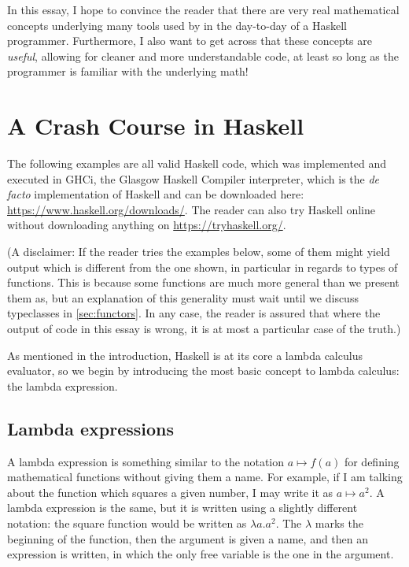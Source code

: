 \documentclass[11pt]{article}
\theoremstyle{nonumberplain}
\begin{document}
In this essay, I hope to convince the reader that there are very real mathematical concepts underlying many tools used by in the day-to-day of a Haskell programmer. Furthermore, I also want to get across that these concepts are \emph{useful}, allowing for cleaner and more understandable code, at least so long as the programmer is familiar with the underlying math!

\section{A Crash Course in Haskell}

The following examples are all valid Haskell code, which was implemented and executed in GHCi, the Glasgow Haskell Compiler interpreter, which is the \textit{de facto} implementation of Haskell and can be downloaded here: \url{https://www.haskell.org/downloads/}. The reader can also try Haskell online without downloading anything on \url{https://tryhaskell.org/}.

(A disclaimer: If the reader tries the examples below, some of them might yield output which is different from the one shown, in particular in regards to types of functions. This is because some functions are much more general than we present them as, but an explanation of this generality must wait until we discuss typeclasses in \ref{sec:functors}. In any case, the reader is assured that where the output of code in this essay is wrong, it is at most a particular case of the truth.)

As mentioned in the introduction, Haskell is at its core a lambda calculus evaluator, so we begin by introducing the most basic concept to lambda calculus: the lambda expression.

\subsection{Lambda expressions}

A lambda expression is something similar to the notation $a \mapsto f(a)$ for defining mathematical functions without giving them a name. For example, if I am talking about the function which squares a given number, I may write it as $a \mapsto a^2$. A lambda expression is the same, but it is written using a slightly different notation: the square function would be written as $\lambda a. a^2$. The $\lambda$ marks the beginning of the function, then the argument is given a name, and then an expression is written, in which the only free variable is the one in the argument.
\end{document}
